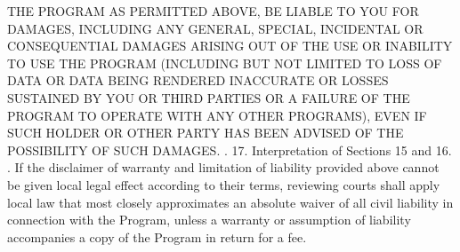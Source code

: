 \begin{script}
 THE PROGRAM AS PERMITTED ABOVE, BE LIABLE TO YOU FOR DAMAGES, INCLUDING ANY
 GENERAL, SPECIAL, INCIDENTAL OR CONSEQUENTIAL DAMAGES ARISING OUT OF THE
 USE OR INABILITY TO USE THE PROGRAM (INCLUDING BUT NOT LIMITED TO LOSS OF
 DATA OR DATA BEING RENDERED INACCURATE OR LOSSES SUSTAINED BY YOU OR THIRD
 PARTIES OR A FAILURE OF THE PROGRAM TO OPERATE WITH ANY OTHER PROGRAMS),
 EVEN IF SUCH HOLDER OR OTHER PARTY HAS BEEN ADVISED OF THE POSSIBILITY OF
 SUCH DAMAGES.
 .
   17. Interpretation of Sections 15 and 16.
 .
   If the disclaimer of warranty and limitation of liability provided
 above cannot be given local legal effect according to their terms,
 reviewing courts shall apply local law that most closely approximates
 an absolute waiver of all civil liability in connection with the
 Program, unless a warranty or assumption of liability accompanies a
 copy of the Program in return for a fee.
\end{script}
